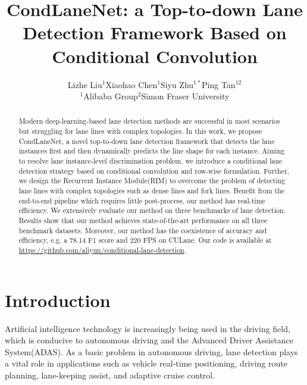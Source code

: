 \documentclass[10pt,twocolumn,letterpaper]{article}
\begin{document}
\title{CondLaneNet: a Top-to-down Lane Detection Framework Based on Conditional Convolution}

\author{Lizhe Liu$^{1}$\hspace{1cm}Xiaohao Chen$^{1}$\hspace{1cm}Siyu Zhu$^{1*}$\hspace{1cm}Ping Tan$^{12}$\\
${}^{1}$Alibaba Group\hspace{1.5cm}${}^{2}$Simon Fraser University\hspace{0cm}
}


\maketitle
\ificcvfinal\thispagestyle{empty}\fi

\def\thefootnote{*}
\begin{abstract}
Modern deep-learning-based lane detection methods are successful in most scenarios but struggling for lane lines with complex topologies.
In this work, we propose CondLaneNet, a novel top-to-down lane detection framework that detects the lane instances first and then dynamically predicts the line shape for each instance. Aiming to resolve lane instance-level discrimination problem, we introduce a conditional lane detection strategy based on conditional convolution and row-wise formulation. Further, we design the Recurrent Instance Module(RIM) to overcome the problem of detecting lane lines with complex topologies such as dense lines and fork lines. 
Benefit from the end-to-end pipeline which requires little post-process, our method has real-time efficiency.
We extensively evaluate our method on three benchmarks of lane detection. Results show that our method achieves state-of-the-art performance on all three benchmark datasets. Moreover, our method has the coexistence of accuracy and efficiency, e.g. a 78.14 F1 score and 220 FPS on CULane. 
Our code is available at  \url{https://github.com/aliyun/conditional-lane-detection}. 

\end{abstract}



\section{Introduction}
Artificial intelligence technology is increasingly being used in the driving field, which is conducive to autonomous driving and the Advanced Driver Assistance System(ADAS). As a basic problem in autonomous driving, lane detection plays a vital role in applications such as vehicle real-time positioning, driving route planning, lane-keeping assist, and adaptive cruise control.
\end{document}

